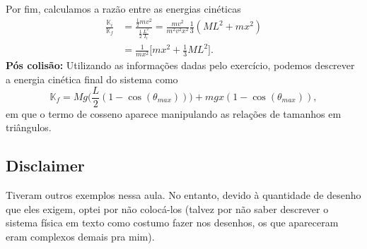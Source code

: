 \documentclass[PhysicsII/physicsII_notes.tex]{subfiles}
\begin{document}
\begin{example}
	Por fim, calculamos a razão entre as energias cinéticas
	\begin{align*}
		\frac{\mathbb{K}_{i}}{\mathbb{K}_{f}} & = \frac{\frac{1}{2}mv^{2}}{\frac{1}{2}\frac{L^{2}}{I_{t}}} = \frac{mv^{2}}{m^{2}v^{2}x^{2}}\frac{1}{3}(ML^{2}+mx^{2}) \\
		                                      & = \frac{1}{mx^{2}}\biggl[mx^{2}+\frac{1}{3}ML^{2}\biggr].
	\end{align*}
	\textbf{Pós colisão:}
	Utilizando as informações dadas pelo exercício, podemos descrever a energia cinética final do sistema como
	\[
		\mathbb{K}_{f}=Mg \biggl(\frac{L}{2}(1-\cos{(\theta_{max} )})\biggr) + mgx(1-\cos{(\theta_{max} )}),
	\]
	em que o termo de cosseno aparece manipulando as relações de tamanhos em triângulos.
\end{example}
\subsection{Disclaimer}
Tiveram outros exemplos nessa aula. No entanto, devido à quantidade de desenho que eles exigem, optei por não colocá-los (talvez por não saber
descrever o sistema física em texto como costumo fazer nos desenhos, os que apareceram eram complexos demais pra mim).
\end{document}
